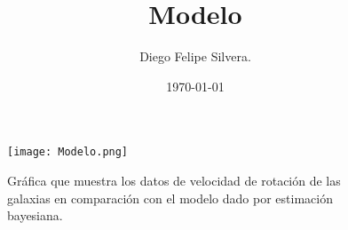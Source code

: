 \documentclass[%
 reprint,
 amsmath,amssymb,
 aps,
]{revtex4-1}
\begin{document}

\title{Modelo}%



\author{Diego Felipe Silvera.}%


\date{\today}%

\begin{abstract}
\noindent 



\end{abstract}

\maketitle



\begin{figure}[h]
   \centering
   
       \texttt{[image: Modelo.png]}
       
   
 \caption{Gráfica que muestra los datos de velocidad de rotación de las galaxias en comparación con el modelo dado por estimación bayesiana.}
 \label{fig:Test}
\end{figure}





 
\end{document}
